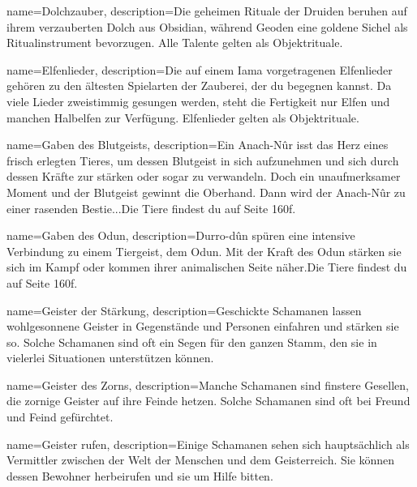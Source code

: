 {
    name={Dolchzauber},
    description={Die geheimen Rituale der Druiden beruhen auf ihrem verzauberten Dolch aus Obsidian, während Geoden eine goldene Sichel als Ritualinstrument bevorzugen. Alle Talente gelten als Objektrituale.}
}


{
    name={Elfenlieder},
    description={Die auf einem Iama vorgetragenen Elfenlieder gehören zu den ältesten Spielarten der Zauberei, der du begegnen kannst. Da viele Lieder zweistimmig gesungen werden, steht die Fertigkeit nur Elfen und manchen Halbelfen zur Verfügung. Elfenlieder gelten als Objektrituale. }
}


{
    name={Gaben des Blutgeists},
    description={Ein Anach-Nûr isst das Herz eines frisch erlegten Tieres, um dessen Blutgeist in sich aufzunehmen und sich durch dessen Kräfte zur stärken oder sogar zu verwandeln. Doch ein unaufmerksamer Moment und der Blutgeist gewinnt die Oberhand. Dann wird der Anach-Nûr zu einer rasenden Bestie...\newline   Die Tiere findest du auf Seite 160f.}
}


{
    name={Gaben des Odun},
    description={Durro-dûn spüren eine intensive Verbindung zu einem Tiergeist, dem Odun. Mit der Kraft des Odun stärken sie sich im Kampf oder kommen ihrer animalischen Seite näher.\newline   Die Tiere findest du auf Seite 160f.}
}


{
    name={Geister der Stärkung},
    description={Geschickte Schamanen lassen wohlgesonnene Geister in Gegenstände und Personen einfahren und stärken sie so. Solche Schamanen sind oft ein Segen für den ganzen Stamm, den sie in vielerlei Situationen unterstützen können.}
}


{
    name={Geister des Zorns},
    description={Manche Schamanen sind finstere Gesellen, die zornige Geister auf ihre Feinde hetzen. Solche Schamanen sind oft bei Freund und Feind gefürchtet.}
}


{
    name={Geister rufen},
    description={Einige Schamanen sehen sich hauptsächlich als Vermittler zwischen der Welt der Menschen und dem Geisterreich. Sie können dessen Bewohner herbeirufen und sie um Hilfe bitten.}
}


